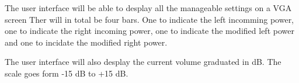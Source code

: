 




The user interface will be able to desplay all the manageable settings on a VGA screen %
	Ther will in total be four bars. One to indicate the left incomming power, one to indicate the right 
	incoming power, one to indicate the modified left power and one to incidate the modified right power.

	The user interface will also desplay the current volume graduated in dB. The scale goes form -15 dB to +15 dB.







